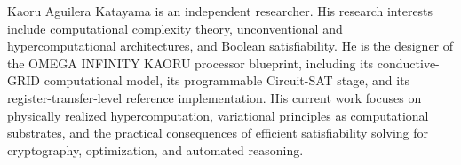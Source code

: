 \documentclass[letterpaper,journal]{IEEEtran}
\begin{document}
\begin{IEEEbiographynophoto}{Kaoru Aguilera Katayama}
is an independent researcher. His research interests include computational
complexity theory, unconventional and hypercomputational architectures, and
Boolean satisfiability. He is the designer of the OMEGA INFINITY KAORU
processor blueprint, including its conductive-GRID computational model, its
programmable Circuit-SAT stage, and its register-transfer-level reference
implementation. His current work focuses on physically realized
hypercomputation, variational principles as computational substrates, and
the practical consequences of efficient satisfiability solving for
cryptography, optimization, and automated reasoning.
\end{IEEEbiographynophoto}
\end{document}
